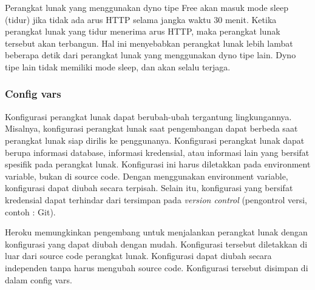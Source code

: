Perangkat lunak yang menggunakan dyno tipe Free akan masuk mode sleep (tidur) jika tidak ada arus HTTP selama jangka waktu 30 menit. Ketika perangkat lunak yang tidur menerima arus HTTP, maka perangkat lunak tersebut akan terbangun. Hal ini menyebabkan perangkat lunak lebih lambat beberapa detik dari perangkat lunak yang menggunakan dyno tipe lain. Dyno tipe lain tidak memiliki mode sleep, dan akan selalu terjaga.

\subsubsection{Config vars}
Konfigurasi perangkat lunak dapat berubah-ubah tergantung lingkungannya. Misalnya, konfigurasi perangkat lunak saat pengembangan dapat berbeda saat perangkat lunak siap dirilis ke penggunanya. Konfigurasi perangkat lunak dapat berupa informasi database, informasi kredensial, atau informasi lain yang bersifat spesifik pada perangkat lunak. Konfigurasi ini harus diletakkan pada environment variable, bukan di source code. Dengan menggunakan environment variable, konfigurasi dapat diubah secara terpisah. Selain itu, konfigurasi yang bersifat kredensial dapat terhindar dari tersimpan pada \textit{version control} (pengontrol versi, contoh : Git).

Heroku memungkinkan pengembang untuk menjalankan perangkat lunak dengan konfigurasi yang dapat diubah dengan mudah. Konfigurasi tersebut diletakkan di luar dari source code perangkat lunak. Konfigurasi dapat diubah secara independen tanpa harus mengubah source code. Konfigurasi tersebut disimpan di dalam config vars.

